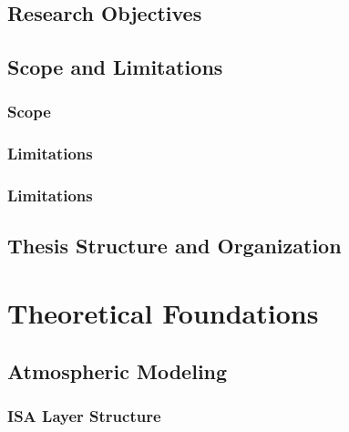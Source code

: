 \documentclass[12pt, a4paper]{report}
\begin{document}
\section{Research Objectives}


\section{Scope and Limitations}


\subsection{Scope}


\subsection{Limitations}


\subsection{Limitations}


\section{Thesis Structure and Organization}


\newpage
\chapter{Theoretical Foundations}
\label{chap:TheoreticalFoundations}

\section{Atmospheric Modeling}
\label{sec:atmospheric_modeling}



\subsection{ISA Layer Structure}
\label{sec:isa_layer_structure}

\end{document}

